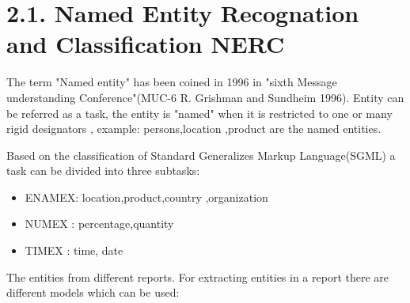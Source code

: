 
\section*{2.1. Named Entity Recognation and Classification  NERC}
The term "Named entity" has been coined in 1996 in "sixth  Message understanding Conference"(MUC-6  R. Grishman and  Sundheim 1996).
Entity can be referred as a task, the entity is "named" when it is restricted to one or many rigid designators \citep{sharnagat2014named}, example: persons,location ,product are the named entities.

Based on the classification of Standard Generalizes Markup Language(SGML) a task can be divided into three subtasks:
\begin{itemize}
\item ENAMEX: location,product,country ,organization
\item NUMEX : percentage,quantity 
\item TIMEX : time, date
\end{itemize}

The entities from different reports.
For extracting entities in a report there are different models which can be used:

